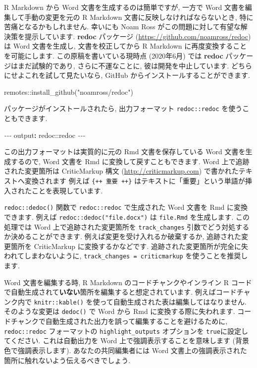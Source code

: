 \documentclass[
  11pt,
]{bxjsreport}
\newenvironment{Shaded}{\begin{snugshade}}{\end{snugshade}}
\newcommand{\AttributeTok}[1]{\textcolor[rgb]{0.77,0.63,0.00}{#1}}
\newcommand{\FunctionTok}[1]{\textcolor[rgb]{0.00,0.00,0.00}{#1}}
\newcommand{\KeywordTok}[1]{\textcolor[rgb]{0.13,0.29,0.53}{\textbf{#1}}}
\newcommand{\NormalTok}[1]{#1}
\newcommand{\PreprocessorTok}[1]{\textcolor[rgb]{0.56,0.35,0.01}{\textit{#1}}}
\newcommand{\SpecialCharTok}[1]{\textcolor[rgb]{0.00,0.00,0.00}{#1}}
\newcommand{\StringTok}[1]{\textcolor[rgb]{0.31,0.60,0.02}{#1}}
\begin{document}
R Markdown から Word 文書を生成するのは簡単ですが, 一方で Word 文書を編集して手動の変更を元の R Markdown 文書に反映しなければならないとき, 特に苦痛となるかもしれません. 幸いにも Noam Ross がこの問題に対して有望な解決策を提示しています. \textbf{redoc} パッケージ (\url{https://github.com/noamross/redoc}) は Word 文書を生成し, 文書を校正してから R Markdown に再度変換することを可能にします. この原稿を書いている現時点 (2020年6月) では \textbf{redoc} パッケージはまだ試験的であり, さらに不運なことに, 彼は開発を中止しています. どちらにせよこれを試して見たいなら, GitHub からインストールすることができます.

\begin{Shaded}
\begin{Highlighting}[]
\NormalTok{remotes}\SpecialCharTok{::}\FunctionTok{install\_github}\NormalTok{(}\StringTok{"noamross/redoc"}\NormalTok{)}
\end{Highlighting}
\end{Shaded}

パッケージがインストールされたら, 出力フォーマット \texttt{redoc::redoc} を使うこともできます.

\begin{Shaded}
\begin{Highlighting}[]
\PreprocessorTok{{-}{-}{-}}
\FunctionTok{output}\KeywordTok{:}\AttributeTok{ redoc::redoc}
\PreprocessorTok{{-}{-}{-}}
\end{Highlighting}
\end{Shaded}

この出力フォーマットは実質的に元の Rmd 文書を保存している Word 文書を生成するので, Word 文書を Rmd に変換して戻すこともできます. Word 上で追跡された変更箇所は CriticMarkup 構文 (\url{http://criticmarkup.com}) で書かれたテキストへ変換されます 例えば \texttt{\{++ 重要 ++\}} はテキストに「重要」という単語が挿入されたことを表現しています.

\texttt{redoc::dedoc()} 関数で \texttt{redoc::redoc} で生成された Word 文書を Rmd に変換できます. 例えば \texttt{redoc::dedoc("file.docx")} は \texttt{file.Rmd} を生成します. この処理では Word 上で追跡された変更箇所を \texttt{track\_changes} 引数でどう対処するか決めることができます. 例えば変更を受け入れるか破棄するか, 追跡された変更箇所を CriticMarkup に変換するかなどです. 追跡された変更箇所が完全に失われてしまわないように, \texttt{track\_changes = \textquotesingle{}criticmarkup\textquotesingle{}} を使うことを推奨します.

Word 文書を編集する時, R Markdown のコードチャンクやインライン R コードで自動生成されて\textbf{いない}箇所を編集すると想定されています. 例えばコードチャンク内で \texttt{knitr::kable()} を使って自動生成された表は編集してはなりません. そのような変更は \texttt{dedoc()} で Word から Rmd に変換する際に失われます. コードチャンクで自動生成された出力を誤って編集することを避けるために, \texttt{redoc::redoc} フォーマットの \texttt{highlight\_outputs} オプションを \texttt{true}に設定してください. これは自動出力を Word 上で強調表示することを意味します (背景色で強調表示します). あなたの共同編集者には Word 文書上の強調表示された箇所に触れないよう伝えるべきでしょう.
\end{document}
